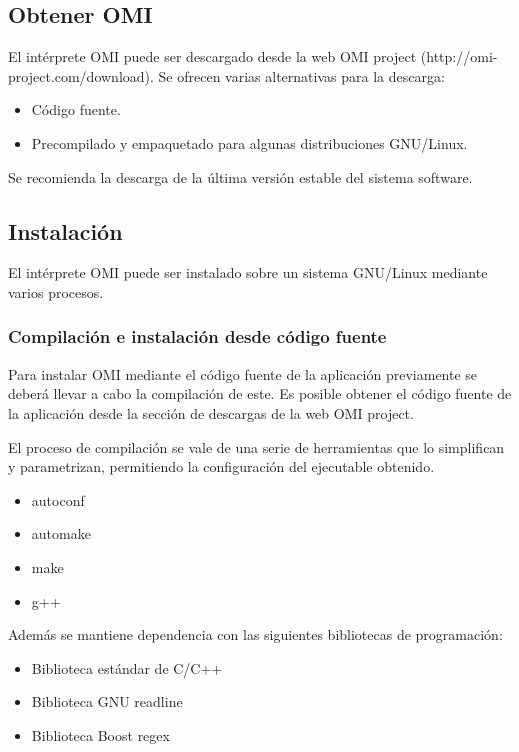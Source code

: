 \subsection{Obtener OMI}
El intérprete OMI puede ser descargado desde la web OMI project (http://omi-project.com/download). Se ofrecen varias 
alternativas para la descarga:

\begin{itemize}
\item Código fuente.
\item Precompilado y empaquetado para algunas distribuciones GNU/Linux.
\end{itemize}

Se recomienda la descarga de la última versión estable del sistema software. 
 
\subsection{Instalación}
El intérprete OMI puede ser instalado sobre un sistema GNU/Linux mediante varios procesos. 

\subsubsection{Compilación e instalación desde código fuente} \label{sec:compile}
Para instalar OMI mediante el código fuente de la aplicación previamente se deberá llevar a cabo la compilación de este. 
Es posible obtener el código fuente de la aplicación desde la sección de descargas de la web OMI project. 

El proceso de compilación se vale de una serie de herramientas que lo simplifican y parametrizan, permitiendo la configuración
del ejecutable obtenido.

\begin{itemize}
\item autoconf
\item automake
\item make
\item g++
\end{itemize}

Además se mantiene dependencia con las siguientes bibliotecas de programación:

\begin{itemize}
\item Biblioteca estándar de C/C++
\item Biblioteca GNU readline
\item Biblioteca Boost regex
\end{itemize}

